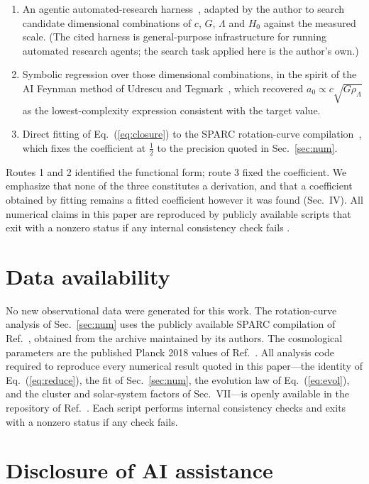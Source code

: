 \documentclass[11pt]{article}
\begin{document}
\begin{enumerate}
\item An agentic automated-research harness~\cite{AutoresearchTool}, adapted by the author to
      search candidate dimensional combinations of $c$, $G$, $\Lambda$ and $H_0$ against the measured
      scale. (The cited harness is general-purpose infrastructure for running automated research agents;
      the search task applied here is the author's own.)
\item Symbolic regression over those dimensional combinations, in the spirit of the AI Feynman
      method of Udrescu and Tegmark~\cite{AIFeynman}, which recovered
      $a_0 \propto c\sqrt{G\rho_\Lambda}$ as the lowest-complexity expression consistent with the
      target value.
\item Direct fitting of Eq.~(\ref{eq:closure}) to the SPARC rotation-curve
      compilation~\cite{SPARC}, which fixes the coefficient at $\tfrac12$ to the precision quoted in
      Sec.~\ref{sec:num}.
\end{enumerate}

Routes 1 and 2 identified the functional form; route 3 fixed the coefficient. We emphasize that none of
the three constitutes a derivation, and that a coefficient obtained by fitting remains a fitted
coefficient however it was found (Sec.~IV). All numerical claims in this paper are reproduced by
publicly available scripts that exit with a nonzero status if any internal consistency check fails
\cite{Repo}.

\section*{Data availability}

No new observational data were generated for this work. The rotation-curve analysis of
Sec.~\ref{sec:num} uses the publicly available SPARC compilation of Ref.~\cite{SPARC}, obtained from
the archive maintained by its authors. The cosmological parameters are the published Planck 2018
values of Ref.~\cite{Planck2018}. All analysis code required to reproduce every numerical result
quoted in this paper---the identity of Eq.~(\ref{eq:reduce}), the fit of Sec.~\ref{sec:num}, the
evolution law of Eq.~(\ref{eq:evol}), and the cluster and solar-system factors of Sec.~VII---is
openly available in the repository of Ref.~\cite{Repo}. Each script performs internal consistency
checks and exits with a nonzero status if any check fails.

\section*{Disclosure of AI assistance}
\end{document}
